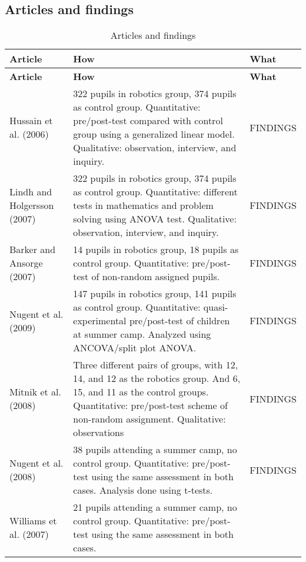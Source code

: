 \subsection*{Articles and findings}
\setlength\LTleft{0px}
\setlength\LTright{0px}
\begin{longtable}{@{\extracolsep{\fill}}p{}p{}p{}}
	\hline \multicolumn{1}{l}{\textbf{Article}} & \multicolumn{1}{l}{\textbf{How}} & \multicolumn{1}{l}{\textbf{What}} \\ \hline\hline
	\endfirsthead
	\hline \multicolumn{1}{l}{\textbf{Article}} & \multicolumn{1}{l}{\textbf{How}} & \multicolumn{1}{l}{\textbf{What}} \\ \hline\hline
	\endhead
	\hline \caption{Articles and findings}\endlastfoot
	Hussain et al. (2006)\cite{hussain2006effect} & 322 pupils in robotics group, 374 pupils as control group. Quantitative: pre/post-test compared with control group using a generalized linear model. Qualitative: observation, interview, and inquiry. & FINDINGS \\\hline
	Lindh and Holgersson (2007)\cite{lindh2007does} & 322 pupils in robotics group, 374 pupils as control group. Quantitative: different tests in mathematics and problem solving using ANOVA test. Qualitative: observation, interview, and inquiry. &  FINDINGS \\\hline
	Barker and Ansorge (2007)\cite{barker2007robotics} & 14 pupils in robotics group, 18 pupils as control group. Quantitative: pre/post-test of non-random assigned pupils. & FINDINGS \\\hline
	Nugent et al. (2009)\cite{nugent2009use} & 147 pupils in robotics group, 141 pupils as control group. Quantitative: quasi-experimental pre/post-test of children at summer camp. Analyzed using ANCOVA/split plot ANOVA. & FINDINGS \\\hline
	Mitnik et al. (2008)\cite{mitnik2008autonomous} & Three different pairs of groups, with 12, 14, and 12 as the robotics group. And 6, 15, and 11 as the control groups. Quantitative: pre/post-test scheme of non-random assignment. Qualitative: observations  & FINDINGS \\\hline
	Nugent et al. (2008)\cite{nugent2008effect} & 38 pupils attending a summer camp, no control group. Quantitative: pre/post-test using the same assessment in both cases. Analysis done using t-tests. & FINDINGS \\\hline
	Williams et al. (2007)\cite{williams2007acquisition} & 21 pupils attending a summer camp, no control group. Quantitative: pre/post-test using the same assessment in both cases.  & \\\hline
\end{longtable}

